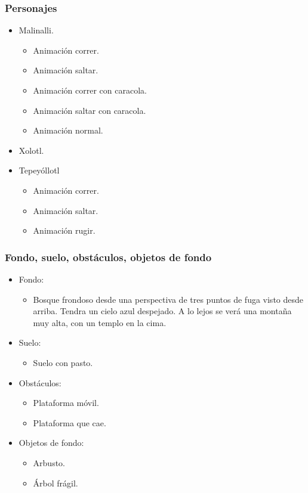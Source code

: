 \documentclass[11pt,letterpaper]{article}
\begin{document}
	\subsubsection{Personajes}
\begin{itemize}
	\item Malinalli.
		\begin{itemize}
			\item Animación correr.
			\item Animación saltar.
			\item Animación correr con caracola.
			\item Animación saltar con caracola.
			\item Animación normal.
		\end{itemize}
	\item Xolotl.
	\item Tepeyóllotl
		\begin{itemize}
			\item Animación correr.
			\item Animación saltar.
			\item Animación rugir.
		\end{itemize}
\end{itemize}
\subsubsection{Fondo, suelo, obstáculos, objetos de fondo}
\begin{itemize} 
	\item Fondo:
\begin{itemize}
	\item Bosque frondoso desde una perspectiva de tres puntos de fuga visto desde arriba. Tendra un cielo azul despejado. A lo lejos se verá una montaña muy alta, con un templo en la cima.
\end{itemize}
	\item Suelo:
		\begin{itemize}
			\item Suelo con pasto.
		\end{itemize}
	\item Obstáculos:
		\begin{itemize}
			\item Plataforma móvil.
			\item Plataforma que cae.
		\end{itemize}
	\item Objetos de fondo:
		\begin{itemize}
			\item Arbusto.
			\item Árbol frágil.
		\end{itemize}
\end{itemize}	
\end{document}
